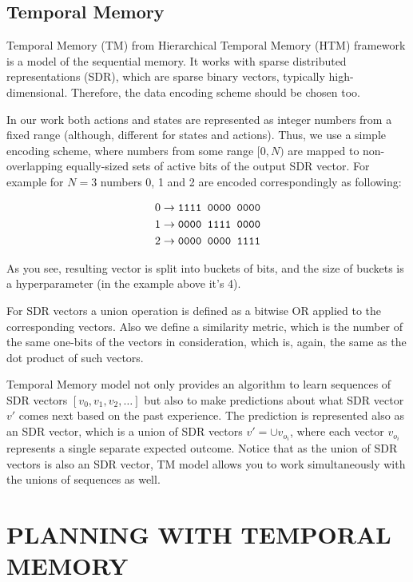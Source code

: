 \documentclass[a4paper,twoside]{article}
\begin{document}
\subsection{Temporal Memory} \label{sec_TM}

Temporal Memory (TM) from Hierarchical Temporal Memory (HTM) framework is a model of the sequential memory. It works with sparse distributed representations (SDR), which are sparse binary vectors, typically high-dimensional. Therefore, the data encoding scheme should be chosen too.

In our work both actions and states are represented as integer numbers from a fixed range (although, different for states and actions). Thus, we use a simple encoding scheme, where numbers from some range $[0, N)$ are mapped to non-overlapping equally-sized sets of active bits of the output SDR vector. For example for $N = 3$ numbers 0, 1 and 2 are encoded correspondingly as following:

$$
\begin{aligned}
  0 & \rightarrow \verb|1111 0000 0000| \\
  1 & \rightarrow \verb|0000 1111 0000| \\
  2 & \rightarrow \verb|0000 0000 1111| \\
\end{aligned}
$$

As you see, resulting vector is split into buckets of bits, and the size of buckets is a hyperparameter (in the example above it's 4).

For SDR vectors a union operation is defined as a bitwise OR applied to the corresponding vectors. Also we define a similarity metric, which is the number of the same one-bits of the vectors in consideration, which is, again, the same as the dot product of such vectors.

Temporal Memory model not only provides an algorithm to learn sequences of SDR vectors $[v_0, v_1, v_2, \dots ]$ but also to make predictions about what SDR vector $v'$ comes next based on the past experience. The prediction is represented also as an SDR vector, which is a union of SDR vectors $v' = \cup v_{o_i}$, where each vector $v_{o_i}$ represents a single separate expected outcome. Notice that as the union of SDR vectors is also an SDR vector, TM model allows you to work simultaneously with the unions of sequences as well.

\section{\uppercase{Planning with Temporal Memory}}
\end{document}
